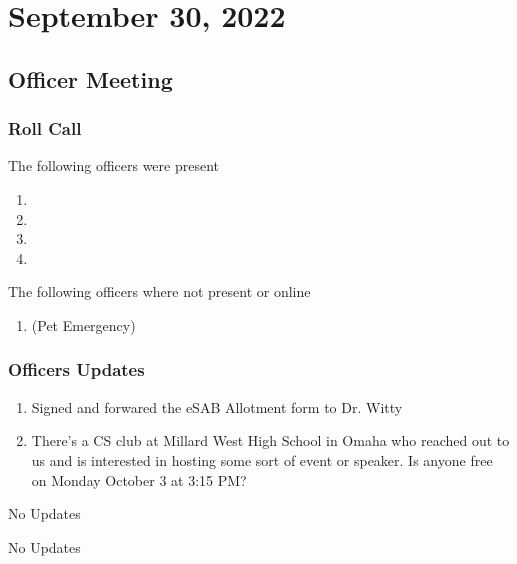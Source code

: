 \section{September 30, 2022}
\subsection{Officer Meeting}

\subsubsection{Roll Call}
The following officers were present

\begin{enumerate}
    \item \president
    \item \tresurer
    \item \primaryprogrammer
    \item \secretary
\end{enumerate}

The following officers where not present or online

\begin{enumerate}
    \item \vicepresident (Pet Emergency)
\end{enumerate}

\subsubsection{Officers Updates}

\textbf{\president}

\begin{enumerate}
    \item Signed and forwared the eSAB Allotment form to Dr. Witty
    \item There's a CS club at Millard West High School in Omaha who reached out to us and is interested in hosting some sort of event or speaker. Is anyone free on Monday October 3 at 3:15 PM?
\end{enumerate}

\textbf{\vicepresident}

No Updates

\textbf{\vicepresident}

No Updates

\textbf{\tresurer}


